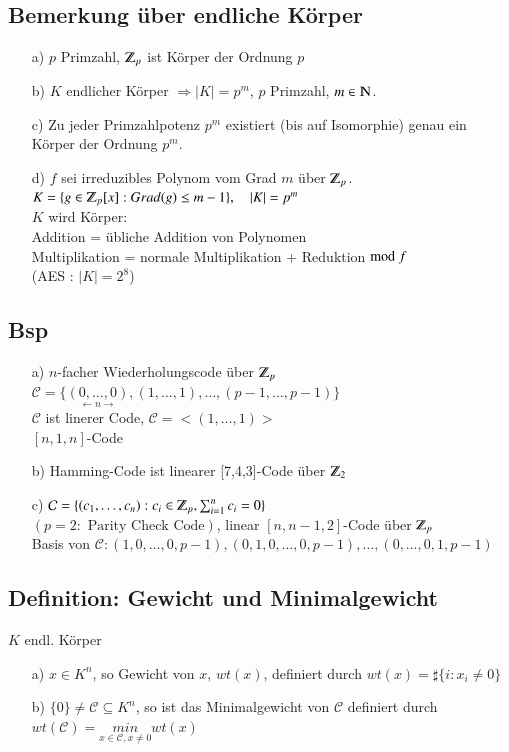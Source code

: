 \subsection{Bemerkung \"uber endliche K\"orper}
\begin{itemize}
	\item[a)] $p$ Primzahl, $\Z_p$ ist K\"orper der Ordnung $p$
	\item[b)] $K$ endlicher K\"orper $\Rightarrow \left| K \right| = p^m$, $p$ Primzahl, $m \in \N$.
	\item[c)] Zu jeder Primzahlpotenz $p^m$ existiert (bis auf Isomorphie) genau ein K\"orper der Ordnung $p^m$.
	\item[d)] $f$ sei irreduzibles Polynom vom Grad $m$ \"uber $\Z_p$.\\
	 $K=\lbrace g \in \Z_p [x] : Grad(g) \leq m-1 \rbrace, \quad \left| K \right| = p^m$\\
	$K$ wird K\"orper:\\
	Addition = \"ubliche Addition von Polynomen \\
	Multiplikation = normale Multiplikation + Reduktion $\text{mod }f$ \\
	(AES : $\left| K \right| = 2^8$)
\end{itemize}

\subsection{Bsp}
\begin{itemize}
	\item[a)] $n$-facher Wiederholungscode \"uber $\Z_p$\\
	$\mathcal{C}=\lbrace \underset{\longleftarrow n \longrightarrow}{(0,\ldots,0)},(1,\ldots,1),\ldots,(p-1,\ldots,p-1)\rbrace$\\
	$\mathcal{C}$ ist linerer Code, $\mathcal{C}=<(1,\ldots,1)>$\\
	$[n,1,n]$-Code
	\item[b)] Hamming-Code ist linearer [7,4,3]-Code \"uber $\Z_2$
	\item[c)] $\mathcal{C} = \lbrace (c_1,\ldots,c_n) : c_i \in \Z_p,\sum^n_{i=1}{c_i}=0 \rbrace$ \\
	$(p=2 : \text{ Parity Check Code})$, linear $[n,n-1,2]$-Code \"uber $\Z_p$\\
	Basis von $\mathcal{C}:(1,0,\ldots,0,p-1), (0,1,0,\ldots,0,p-1), \ldots, (0,\ldots,0,1,p-1)$
\end{itemize}
\subsection{Definition: Gewicht und Minimalgewicht}
$K$ endl. K\"orper
\begin{itemize}
	\item[a)] $x \in K^n$, so Gewicht von $x$, $wt(x)$, definiert durch $wt(x)=\sharp \lbrace i:x_i\neq0 \rbrace$
	\item[b)] $\lbrace 0 \rbrace \neq \mathcal{C} \subseteq K^n$, so ist das Minimalgewicht von $\mathcal{C}$ definiert durch $wt(\mathcal{C})=\underset{x\in\mathcal{C}, x\neq 0}{min} wt(x)$
\end{itemize}

